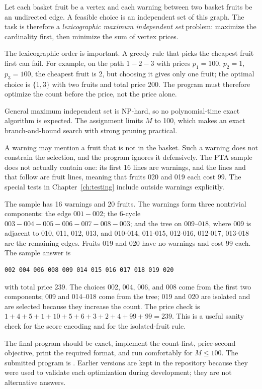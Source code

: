 \documentclass[12pt,a4paper]{report}
\newcommand{\code}[1]{\texttt{\detokenize{#1}}}
\begin{document}
Let each basket fruit be a vertex and each warning between two basket fruits be
an undirected edge.  A feasible choice is an independent set of this graph.
The task is therefore a \emph{lexicographic maximum independent set} problem:
maximize the cardinality first, then minimize the sum of vertex prices.

The lexicographic order is important.  A greedy rule that picks the cheapest
fruit first can fail.  For example, on the path $1-2-3$ with prices
$p_1=100$, $p_2=1$, $p_3=100$, the cheapest fruit is 2, but choosing it gives
only one fruit; the optimal choice is $\{1,3\}$ with two fruits and total price
200.  The program must therefore optimize the count before the price, not the
price alone.

General maximum independent set is NP-hard, so no polynomial-time exact
algorithm is expected.  The assignment limits $M$ to 100, which makes an exact
branch-and-bound search with strong pruning practical.

A warning may mention a fruit that is not in the basket.  Such a warning does
not constrain the selection, and the program ignores it defensively.  The PTA
sample does not actually contain one: its first 16 lines are warnings, and the
lines \code{020 99} and \code{019 99} that follow are fruit lines, meaning that
fruits 020 and 019 each cost 99.  The special tests in
Chapter~\ref{ch:testing} include outside warnings explicitly.

The sample has 16 warnings and 20 fruits.  The warnings form three nontrivial
components: the edge $001-002$; the 6-cycle
$003-004-005-006-007-008-003$; and the tree on $009$--$018$, where 009 is
adjacent to 010, 011, 012, 013, and 010-014, 011-015, 012-016, 012-017,
013-018 are the remaining edges.  Fruits 019 and 020 have no warnings and cost
99 each.  The sample answer is
\begin{verbatim}
002 004 006 008 009 014 015 016 017 018 019 020
\end{verbatim}
with total price 239.  The choices 002, 004, 006, and 008 come from the first
two components; 009 and 014--018 come from the tree; 019 and 020 are isolated
and are selected because they increase the count.  The price check is
$1+4+5+1+10+5+6+3+2+4+99+99=239$.  This is a useful sanity check for the score
encoding and for the isolated-fruit rule.

The final program should be exact, implement the count-first, price-second
objective, print the required format, and run comfortably for $M\le100$.  The
submitted program is \code{v8_cycle_tree_dp.c}.  Earlier versions are kept in
the repository because they were used to validate each optimization during
development; they are not alternative answers.
\end{document}
